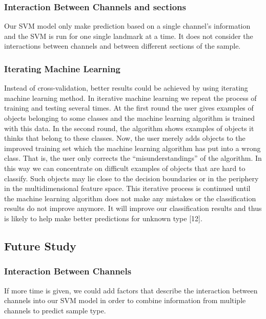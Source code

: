\documentclass[10pt,letterpaper]{article}
\begin{document}
\subsubsection{Interaction Between Channels and
sections}\label{interaction-between-channels-and-sections}

Our SVM model only make prediction based on a single channel's
information and the SVM is run for one single landmark at a time. It
does not consider the interactions between channels and between
different sections of the sample.

\subsubsection{Iterating Machine
Learning}\label{iterating-machine-learning}

Instead of cross-validation, better results could be achieved by using
iterating machine learning method. In iterative machine learning we
repeat the process of training and testing several times. At the first
round the user gives examples of objects belonging to some classes and
the machine learning algorithm is trained with this data. In the second
round, the algorithm shows examples of objects it thinks that belong to
these classes. Now, the user merely adds objects to the improved
training set which the machine learning algorithm has put into a wrong
class. That is, the user only corrects the ``misunderstandings'' of the
algorithm. In this way we can concentrate on difficult examples of
objects that are hard to classify. Such objects may lie close to the
decision boundaries or in the periphery in the multidimensional feature
space. This iterative process is continued until the machine learning
algorithm does not make any mistakes or the classification results do
not improve anymore. It will improve our classification results and thus
is likely to help make better predictions for unknown type {[}12{]}.

\subsection{Future Study}\label{future-study}

\subsubsection{Interaction Between
Channels}\label{interaction-between-channels}

If more time is given, we could add factors that describe the
interaction between channels into our SVM model in order to combine
information from multiple channels to predict sample type.
\end{document}
